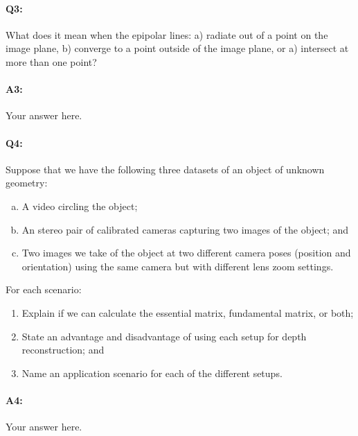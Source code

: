 
\pagebreak
\paragraph{Q3:} What does it mean when the epipolar lines: a) radiate out of a point on the image plane, b) converge to a point outside of the image plane, or a) intersect at more than one point?

\paragraph{A3:} Your answer here.


\pagebreak
\paragraph{Q4:}
Suppose that we have the following three datasets of an object of unknown geometry:
\begin{enumerate}[(a)]
\item A video circling the object;
\item An stereo pair of calibrated cameras capturing two images of the object; and
\item Two images we take of the object at two different camera poses (position and orientation) using the same camera but with different lens zoom settings.
\end{enumerate}
For each scenario:
\begin{enumerate}
\item Explain if we can calculate the essential matrix, fundamental matrix, or both;
\item State an advantage and disadvantage of using each setup for depth reconstruction; and
\item Name an application scenario for each of the different setups.
\end{enumerate}

\paragraph{A4:} Your answer here.









